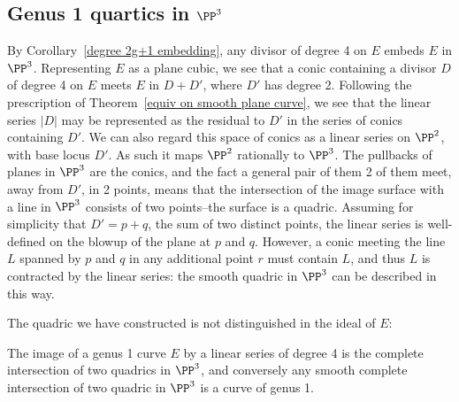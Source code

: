 \subsection{Genus 1 quartics in $\PP^3$} \label{g=1 in P4}

By Corollary~\ref{degree 2g+1 embedding}, any divisor of degree 4 on $E$ embeds $E$ in $\PP^3$. Representing $E$ as a plane cubic, we see that a conic containing a divisor $D$ of degree 4 on $E$ meets $E$ in $D+D'$, where $D'$ has degree 2.
Following the prescription 
of Theorem~\ref{equiv on smooth plane curve}, we see that the linear series $|D|$ may be represented as the residual to
$D'$ in the
series of conics containing $D'$. We can also regard this space of conics as a linear series on $\PP^2$, with base locus $D'$.
As such it maps $\PP^2$ rationally to $\PP^3$. The pullbacks of planes in $\PP^3$ are the conics, and the fact a general pair of them 2 of them meet,
away from $D'$, in 2 points, means that the intersection of the image surface with a line in $\PP^3$ consists of two points--the surface is a quadric. Assuming for simplicity that $D' = p+q$, the sum of two distinct points, the linear series is well-defined on the blowup of the plane at $p$ and $q$. However, a conic meeting the line $L$ spanned by $p$ and $q$ in any additional point $r$ must contain $L$, and thus $L$ is contracted by the linear series: the smooth quadric in $\PP^3$ can be described in this way.

The quadric we have constructed is not distinguished in the ideal of $E$:

\begin{proposition}\label{elliptic quartic as complete intersection}
 The image of a genus 1 curve $E$ by a linear series of degree 4
 is the complete intersection of two quadrics in $\PP^3$, and conversely any  smooth complete intersection of two quadric
 in $\PP^3$ is a curve of
 genus 1.
\end{proposition}

